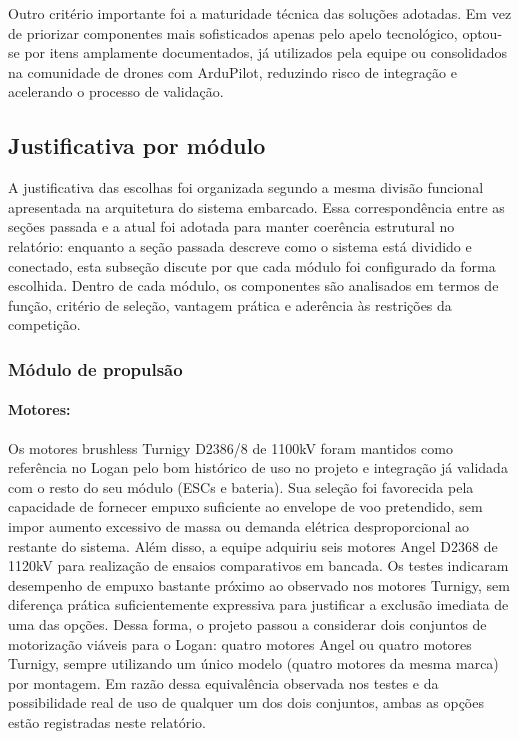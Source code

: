 Outro critério importante foi a maturidade técnica das soluções adotadas. Em vez de priorizar componentes mais sofisticados apenas pelo apelo tecnológico, optou-se por itens amplamente documentados, já utilizados pela equipe ou consolidados na comunidade de drones com ArduPilot, reduzindo risco de integração e acelerando o processo de validação.

\subsection{Justificativa por módulo}

A justificativa das escolhas foi organizada segundo a mesma divisão funcional apresentada na arquitetura do sistema embarcado. Essa correspondência entre as seções passada e a atual foi adotada para manter coerência estrutural no relatório: enquanto a seção passada descreve como o sistema está dividido e conectado, esta subseção discute por que cada módulo foi configurado da forma escolhida. Dentro de cada módulo, os componentes são analisados em termos de função, critério de seleção, vantagem prática e aderência às restrições da competição.

\subsubsection{Módulo de propulsão}

\paragraph{Motores:}
Os motores brushless Turnigy D2386/8 de 1100kV foram mantidos como referência no Logan pelo bom histórico de uso no projeto e integração já validada com o resto do seu módulo (ESCs e bateria). Sua seleção foi favorecida pela capacidade de fornecer empuxo suficiente ao envelope de voo pretendido, sem impor aumento excessivo de massa ou demanda elétrica desproporcional ao restante do sistema. Além disso, a equipe adquiriu seis motores Angel D2368 de 1120kV para realização de ensaios comparativos em bancada. Os testes indicaram desempenho de empuxo bastante próximo ao observado nos motores Turnigy, sem diferença prática suficientemente expressiva para justificar a exclusão imediata de uma das opções. Dessa forma, o projeto passou a considerar dois conjuntos de motorização viáveis para o Logan: quatro motores Angel ou quatro motores Turnigy, sempre utilizando um único modelo (quatro motores da mesma marca) por montagem. Em razão dessa equivalência observada nos testes e da possibilidade real de uso de qualquer um dos dois conjuntos, ambas as opções estão registradas neste relatório.

